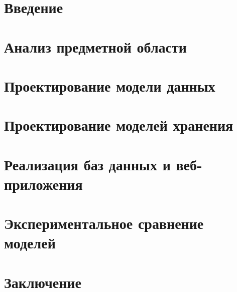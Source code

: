 \section*{Введение}

\newpage

\section{Анализ предметной области}


\section{Проектирование модели данных}


\section{Проектирование моделей хранения}


\section{Реализация баз данных и веб-приложения}


\section{Экспериментальное сравнение моделей}


\newpage
\section*{Заключение}

